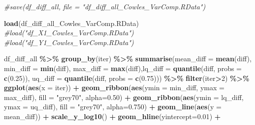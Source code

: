 \documentclass[
]{article}
\newenvironment{Shaded}{\begin{snugshade}}{\end{snugshade}}
\newcommand{\AttributeTok}[1]{\textcolor[rgb]{0.13,0.29,0.53}{#1}}
\newcommand{\CommentTok}[1]{\textcolor[rgb]{0.56,0.35,0.01}{\textit{#1}}}
\newcommand{\DecValTok}[1]{\textcolor[rgb]{0.00,0.00,0.81}{#1}}
\newcommand{\FloatTok}[1]{\textcolor[rgb]{0.00,0.00,0.81}{#1}}
\newcommand{\FunctionTok}[1]{\textcolor[rgb]{0.13,0.29,0.53}{\textbf{#1}}}
\newcommand{\NormalTok}[1]{#1}
\newcommand{\SpecialCharTok}[1]{\textcolor[rgb]{0.81,0.36,0.00}{\textbf{#1}}}
\newcommand{\StringTok}[1]{\textcolor[rgb]{0.31,0.60,0.02}{#1}}
\begin{document}
\begin{Shaded}
\begin{Highlighting}[]
\CommentTok{\#save(df\_diff\_all, file = "df\_diff\_all\_Cowles\_VarComp.RData")}
\end{Highlighting}
\end{Shaded}

\begin{Shaded}
\begin{Highlighting}[]
\FunctionTok{load}\NormalTok{(}\StringTok{\textquotesingle{}df\_diff\_all\_Cowles\_VarComp.RData\textquotesingle{}}\NormalTok{)}
\CommentTok{\#load("df\_X1\_Cowles\_VarComp.RData")}
\CommentTok{\#load("df\_Y1\_Cowles\_VarComp.RData")}
\end{Highlighting}
\end{Shaded}

\begin{Shaded}
\begin{Highlighting}[]
\NormalTok{df\_diff\_all }\SpecialCharTok{\%\textgreater{}\%}
  \FunctionTok{group\_by}\NormalTok{(iter) }\SpecialCharTok{\%\textgreater{}\%}
  \FunctionTok{summarise}\NormalTok{(}\AttributeTok{mean\_diff =} \FunctionTok{mean}\NormalTok{(diff), }\AttributeTok{min\_diff =}  \FunctionTok{min}\NormalTok{(diff), }\AttributeTok{max\_diff =} \FunctionTok{max}\NormalTok{(diff),}\AttributeTok{lq\_diff =}  \FunctionTok{quantile}\NormalTok{(diff, }\AttributeTok{probs =} \FunctionTok{c}\NormalTok{(}\FloatTok{0.25}\NormalTok{)), }\AttributeTok{uq\_diff =} \FunctionTok{quantile}\NormalTok{(diff, }\AttributeTok{probs =} \FunctionTok{c}\NormalTok{(}\FloatTok{0.75}\NormalTok{))) }\SpecialCharTok{\%\textgreater{}\%} 
  \FunctionTok{filter}\NormalTok{(iter}\SpecialCharTok{\textgreater{}}\DecValTok{2}\NormalTok{) }\SpecialCharTok{\%\textgreater{}\%}  
  \FunctionTok{ggplot}\NormalTok{(}\FunctionTok{aes}\NormalTok{(}\AttributeTok{x =}\NormalTok{ iter)) }\SpecialCharTok{+}
  \FunctionTok{geom\_ribbon}\NormalTok{(}\FunctionTok{aes}\NormalTok{(}\AttributeTok{ymin =}\NormalTok{ min\_diff, }\AttributeTok{ymax =}\NormalTok{ max\_diff), }\AttributeTok{fill =} \StringTok{"grey70"}\NormalTok{, }\AttributeTok{alpha=}\FloatTok{0.50}\NormalTok{) }\SpecialCharTok{+}
  \FunctionTok{geom\_ribbon}\NormalTok{(}\FunctionTok{aes}\NormalTok{(}\AttributeTok{ymin =}\NormalTok{ lq\_diff, }\AttributeTok{ymax =}\NormalTok{ uq\_diff), }\AttributeTok{fill =} \StringTok{"grey70"}\NormalTok{, }\AttributeTok{alpha=}\FloatTok{0.750}\NormalTok{) }\SpecialCharTok{+}
  \FunctionTok{geom\_line}\NormalTok{(}\FunctionTok{aes}\NormalTok{(}\AttributeTok{y =}\NormalTok{ mean\_diff)) }\SpecialCharTok{+} \FunctionTok{scale\_y\_log10}\NormalTok{() }\SpecialCharTok{+} \FunctionTok{geom\_hline}\NormalTok{(}\AttributeTok{yintercept=}\FloatTok{0.01}\NormalTok{) }\SpecialCharTok{+}

\end{Highlighting}
\end{Shaded}
\end{document}
